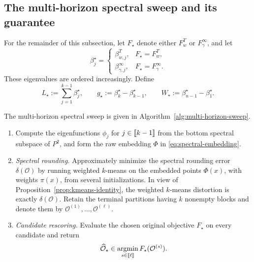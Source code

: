 \documentclass[11pt]{article}
\newcommand{\1}{\mathbf{1}}
\providecommand{\llbracket}{\mathopen{[\mkern-2.7mu[}}
\providecommand{\rrbracket}{\mathclose{]\mkern-2.7mu]}}
\begin{document}
\subsection{The multi-horizon spectral sweep and its guarantee}

For the remainder of this subsection, let $F_\star$ denote either
$F_w^T$ or $F_\gamma^\infty$, and let
\[
    \beta_j^\star
    =\begin{cases}
       \beta_{w,j}^T,&F_\star=F_w^T,\\
       \beta_{\gamma,j}^\infty,
          &F_\star=F_\gamma^\infty.
     \end{cases}
\]
These eigenvalues are ordered increasingly.  Define
\begin{equation}
    L_\star:=\sum_{j=1}^{k-1}\beta_j^\star,
    \qquad
    g_\star:=\beta_{k}^\star-\beta_{k-1}^\star,
    \qquad
    W_\star:=\beta_{n-1}^\star-\beta_1^\star.
    \label{eq:multi-L-g-W}
\end{equation}

The multi-horizon spectral sweep is given in
Algorithm~\ref{alg:multi-horizon-sweep}.

\begin{algorithm}[H]
\caption{Multi-horizon spectral sweep}
\label{alg:multi-horizon-sweep}
\begin{enumerate}
    \item Compute the eigenfunctions $\phi_j$ for
    $j\in\llbracket k-1\rrbracket$ from the bottom
    spectral subspace of $P^2$, and form the raw embedding
    $\Phi$ in \eqref{eq:spectral-embedding}.
    \item \emph{Spectral rounding.} Approximately minimize the spectral rounding error
    $\delta(\mathcal O)$ by running weighted $k$-means on the embedded
    points $\Phi(x)$, with weights $\pi(x)$, from several
    initializations.  In view of Proposition~\ref{prop:kmeans-identity},
    the weighted $k$-means distortion is exactly $\delta(\mathcal O)$.
    Retain the terminal partitions having $k$ nonempty blocks and denote
    them by
    $\mathcal O^{(1)},\ldots,\mathcal O^{(\ell)}$.
    \item \emph{Candidate rescoring.} Evaluate the chosen original objective $F_\star$ on every
    candidate and return
    \[
        \widehat{\mathcal O}_\star
        \in\operatorname*{argmin}_{s\in\llbracket\ell\rrbracket}
          F_\star(\mathcal O^{(s)}).
    \]
\end{enumerate}
\end{algorithm}
\end{document}
